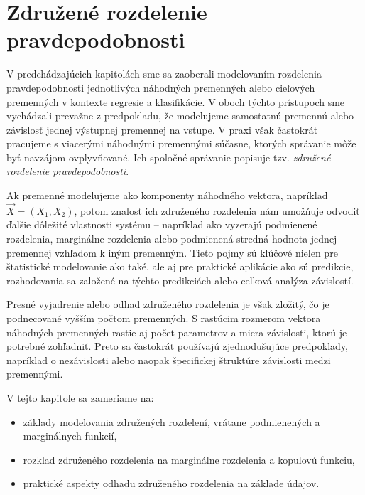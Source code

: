 \chapter{Združené rozdelenie pravdepodobnosti}\label{sec:joint_dist}

V predchádzajúcich kapitolách sme sa zaoberali modelovaním rozdelenia pravdepodobnosti jednotlivých náhodných premenných alebo cieľových premenných v kontexte regresie a klasifikácie. V oboch týchto prístupoch sme vychádzali prevažne z predpokladu, že modelujeme samostatnú premennú alebo závislosť jednej výstupnej premennej na vstupe. V praxi však častokrát pracujeme s viacerými náhodnými premennými súčasne, ktorých správanie môže byť navzájom ovplyvňované. Ich spoločné správanie popisuje tzv. \textit{združené rozdelenie pravdepodobnosti}.

Ak premenné modelujeme ako komponenty náhodného vektora, napríklad $\vec{X} = (X_1, X_2)$, potom znalosť ich združeného rozdelenia nám umožňuje odvodiť ďalšie dôležité vlastnosti systému – napríklad ako vyzerajú podmienené rozdelenia, marginálne rozdelenia alebo podmienená stredná hodnota jednej premennej vzhľadom k iným premenným. Tieto pojmy sú kľúčové nielen pre štatistické modelovanie ako také, ale aj pre praktické aplikácie ako sú predikcie, rozhodovania sa založené na týchto predikciách alebo celková analýza závislostí.

Presné vyjadrenie alebo odhad združeného rozdelenia je však zložitý, čo je podnecované vyšším počtom premenných. S rastúcim rozmerom vektora náhodných premenných rastie aj počet parametrov a miera závislosti, ktorú je potrebné zohľadniť. Preto sa častokrát používajú zjednodušujúce predpoklady, napríklad o nezávislosti alebo naopak špecifickej štruktúre závislosti medzi premennými.

V tejto kapitole sa zameriame na:
\begin{itemize}
  \item základy modelovania združených rozdelení, vrátane podmienených a marginálnych funkcií,
  \item rozklad združeného rozdelenia na marginálne rozdelenia a kopulovú funkciu,
  \item praktické aspekty odhadu združeného rozdelenia na základe údajov.
\end{itemize}

